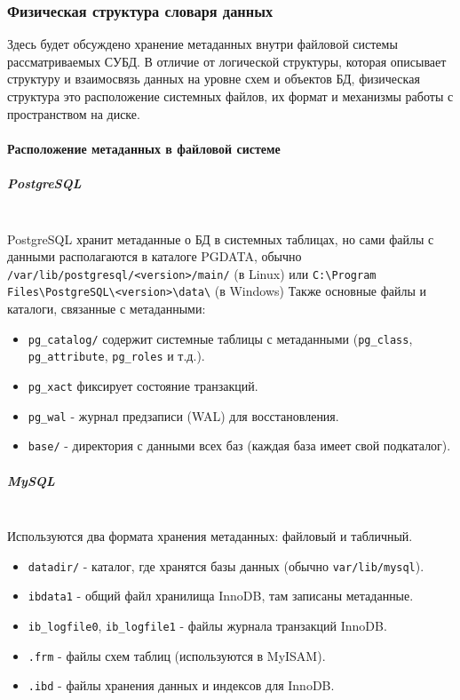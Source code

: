 \subsubsection{Физическая структура словаря данных}

Здесь будет обсуждено хранение метаданных внутри файловой системы рассматриваемых СУБД. В отличие от логической структуры, которая описывает структуру и взаимосвязь данных на уровне схем и объектов БД, физическая структура это расположение системных файлов, их формат и механизмы работы с пространством на диске.

\paragraph{Расположение метаданных в файловой системе}
\subparagraph{PostgreSQL} \autocite{PostgreSQLdocc65} ~\\

PostgreSQL хранит метаданные о БД в системных таблицах, но сами файлы с данными располагаются в каталоге PGDATA, обычно \texttt{/var/lib/postgresql/<version>/main/} (в Linux) или \texttt{C:\textbackslash{}Program Files\textbackslash{}PostgreSQL\textbackslash{}<version>\textbackslash{}data\textbackslash{}} (в Windows)
Также основные файлы и каталоги, связанные с метаданными:
\begin{itemize}
    \item \texttt{pg\_catalog/} содержит системные таблицы с метаданными (\texttt{pg\_class}, \texttt{pg\_attribute}, \texttt{pg\_roles} и т.д.).
    \item \texttt{pg\_xact} фиксирует состояние транзакций.
    \item \texttt{pg\_wal} - журнал предзаписи (WAL) для восстановления.
    \item \texttt{base/} - директория с данными всех баз (каждая база имеет свой подкаталог).
\end{itemize}

\subparagraph{MySQL} \autocite[§17.6]{Mysqldoc4} ~\\

Используются два формата хранения метаданных: файловый и табличный.

\begin{itemize}
    \item \texttt{datadir/} - каталог, где хранятся базы данных (обычно \texttt{var/lib/mysql}).
    \item \texttt{ibdata1} - общий файл хранилища InnoDB, там записаны метаданные.
    \item \texttt{ib\_logfile0}, \texttt{ib\_logfile1} - файлы журнала транзакций InnoDB.
    \item \texttt{.frm} - файлы схем таблиц (используются в MyISAM).
    \item \texttt{.ibd} - файлы хранения данных и индексов для InnoDB. 
\end{itemize}


